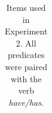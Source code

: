 \documentclass[floatsintext,man]{apa6}
\begin{document}
\begin{longtable}{ |p{3in}| |p{2 in}|}
\caption{Items used in Experiment 2. All predicates were paired with the verb \emph{have/has}.} 
\end{longtable}

\endgroup




\newpage
\end{document}
